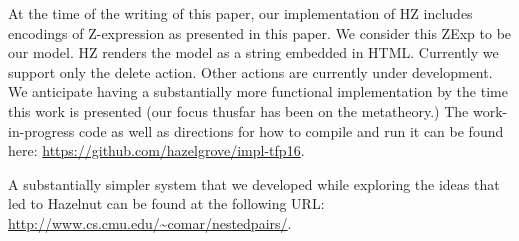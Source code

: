 At the time of the writing of this paper, our implementation of HZ includes encodings of Z-expression as presented in this paper.
We consider this ZExp to be our model. 
HZ renders the model as a string embedded in HTML.
Currently we support only the delete action.  Other actions are currently under development. We anticipate having a substantially more functional implementation by the time this work is presented (our focus thusfar has been on the metatheory.) 
The work-in-progress code as well as directions for how to compile and run it can be found here: \url{https://github.com/hazelgrove/impl-tfp16}.

A substantially simpler system that we developed while exploring the ideas that led to Hazelnut can be found at the following URL:
\url{http://www.cs.cmu.edu/~comar/nestedpairs/}.
